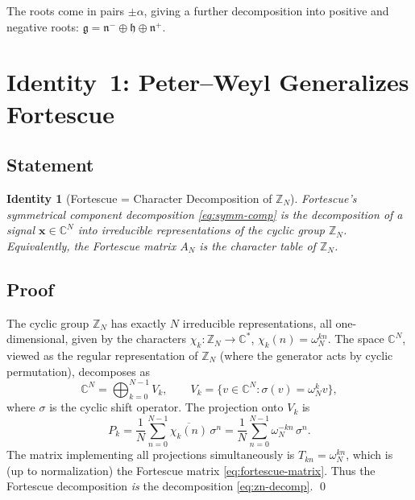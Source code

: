 \documentclass[11pt]{article}
\newtheorem{identity}[theorem]{Identity}
\newcommand{\g}{\mathfrak{g}}
\newcommand{\h}{\mathfrak{h}}
\newcommand{\ZZ}{\mathbb{Z}}
\newcommand{\CC}{\mathbb{C}}
\begin{document}
The roots come in pairs $\pm \alpha$, giving a further decomposition
into positive and negative roots:
$\g = \mathfrak{n}^- \oplus \h \oplus \mathfrak{n}^+$.

\section{Identity~1: Peter--Weyl Generalizes Fortescue}
\label{sec:peter-weyl}

\subsection{Statement}

\begin{identity}[Fortescue = Character Decomposition of $\ZZ_N$]
\label{id:fortescue-peter-weyl}
Fortescue's symmetrical component decomposition
\eqref{eq:symm-comp} is the decomposition of a signal
$\mathbf{x} \in \CC^N$ into irreducible representations of the
cyclic group $\ZZ_N$. Equivalently, the Fortescue matrix $A_N$ is the
character table of\/ $\ZZ_N$.
\end{identity}

\subsection{Proof}

The cyclic group $\ZZ_N$ has exactly $N$ irreducible representations,
all one-dimensional, given by the characters
$\chi_k : \ZZ_N \to \CC^*$, $\chi_k(n) = \omega_N^{kn}$. The space
$\CC^N$, viewed as the regular representation of $\ZZ_N$ (where the
generator acts by cyclic permutation), decomposes as
\begin{equation}\label{eq:zn-decomp}
  \CC^N = \bigoplus_{k=0}^{N-1} V_k,
  \qquad V_k = \{v \in \CC^N : \sigma(v) = \omega_N^k v\},
\end{equation}
where $\sigma$ is the cyclic shift operator. The projection onto $V_k$
is
\begin{equation}\label{eq:projection}
  P_k = \frac{1}{N} \sum_{n=0}^{N-1} \overline{\chi_k(n)} \, \sigma^n
      = \frac{1}{N} \sum_{n=0}^{N-1} \omega_N^{-kn} \, \sigma^n.
\end{equation}
The matrix implementing all projections simultaneously is
$T_{kn} = \omega_N^{kn}$, which is (up to normalization) the Fortescue
matrix \eqref{eq:fortescue-matrix}. Thus the Fortescue decomposition
\emph{is} the decomposition \eqref{eq:zn-decomp}. \qed
\end{document}
